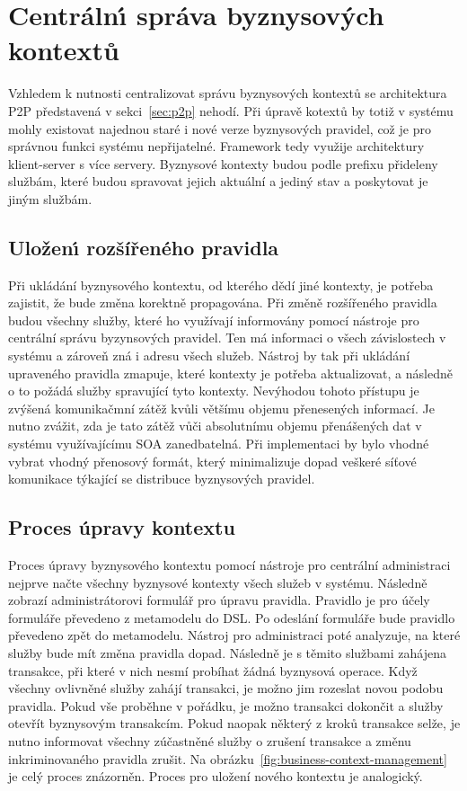 \section{Centráln\'{\i} správa byznysových kontextů}

Vzhledem k nutnosti centralizovat správu byznysových kontextů se
architektura \gls{P2P} představená v sekci~\ref{sec:p2p} nehodí.
Při úpravě kotextů by totiž v systému mohly existovat najednou staré i nové verze
byznysových pravidel, což je pro správnou funkci systému nepřijatelné.
Framework tedy využije architektury klient-server s více servery.
Byznysové kontexty budou podle prefixu přideleny službám, které budou
spravovat jejich aktuální a jediný stav a poskytovat je jiným službám.

\subsection{Uložen\'{\i} rozšířeného pravidla}\label{sec:saving-context}

Při ukládání byznysového kontextu, od kterého dědí jiné kontexty, je potřeba zajistit,
že bude změna korektně propagována. Při změně rozšířeného pravidla budou všechny služby,
které ho využívají informovány pomocí nástroje pro centrální správu byzynsových pravidel.
Ten má informaci o všech závislostech v systému a zároveň zná i adresu všech služeb.
Nástroj by tak při ukládání upraveného pravidla zmapuje, které kontexty je potřeba aktualizovat,
a následně o to požádá služby spravující tyto kontexty. Nevýhodou tohoto přístupu je zvýšená komunikačmní
zátěž kvůli většímu objemu přenesených informací. Je nutno zvážit, zda je tato zátěž vůči absolutnímu objemu
přenášených dat v systému využívajícímu \gls{SOA} zanedbatelná. Při implementaci by bylo vhodné
vybrat vhodný přenosový formát, který minimalizuje dopad veškeré síťové komunikace týkající se
distribuce byznysových pravidel.

\subsection{Proces úpravy kontextu}

Proces úpravy byznysového kontextu pomocí nástroje pro centrální administraci nejprve načte všechny
byznysové kontexty všech služeb v systému. Následně zobrazí administrátorovi formulář pro úpravu pravidla.
Pravidlo je pro účely formuláře převedeno z metamodelu do \gls{DSL}. Po odeslání formuláře bude pravidlo
převedeno zpět do metamodelu. Nástroj pro administraci poté analyzuje, na které služby bude
mít změna pravidla dopad. Následně je s těmito službami zahájena transakce, při které v nich
nesmí probíhat žádná byznysová operace. Když všechny ovlivněné služby zahájí transakci, je možno
jim rozeslat novou podobu pravidla. Pokud vše proběhne v pořádku, je možno transakci dokončit
a služby otevřít byznysovým transakcím. Pokud naopak některý z kroků transakce selže, je nutno
informovat všechny zúčastněné služby o zrušení transakce a změnu inkriminovaného pravidla zrušit.
Na obrázku~\ref{fig:business-context-management} je celý proces znázorněn. Proces pro uložení
nového kontextu je analogický.

